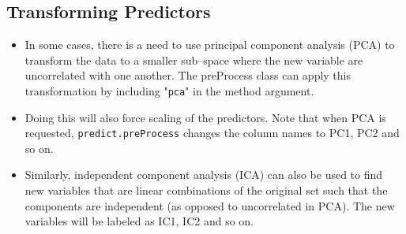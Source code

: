 \documentclass[caret-main.tex]{subfiles}
\begin{document}
\subsection{Transforming Predictors}

\begin{itemize}
\item In some cases, there is a need to use principal component analysis (PCA) to transform the data to a smaller sub–space where the new variable are uncorrelated with one another. The preProcess class can apply this transformation by including "\texttt{pca}" in the method argument. 

\item Doing this will also force scaling of the predictors. Note that when PCA is requested, \texttt{predict.preProcess} changes the column names to PC1, PC2 and so on.

\item Similarly, independent component analysis (ICA) can also be used to find new variables that are linear combinations of the original set such that the components are independent (as opposed to uncorrelated in PCA). The new variables will be labeled as IC1, IC2 and so on.

\end{itemize}

%
%
%
%
%
\end{document}
